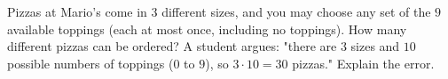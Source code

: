 Pizzas at Mario's come in $3$ different sizes, and you may choose any set of the $9$ available toppings (each at most once, including no toppings). How many different pizzas can be ordered? A student argues: "there are $3$ sizes and $10$ possible numbers of toppings ($0$ to $9$), so $3\cdot10=30$ pizzas." Explain the error.
